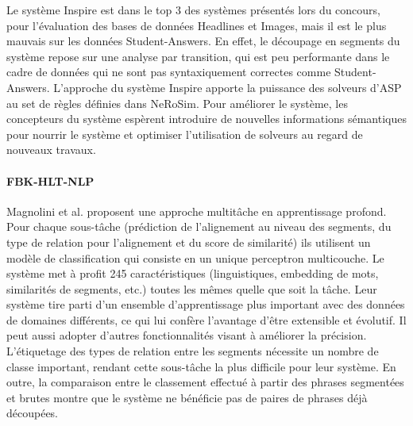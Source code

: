 \documentclass[a4paper, twoside, 11pt]{article}
\begin{document}
Le système Inspire est dans le top 3 des systèmes présentés lors du concours, pour l'évaluation des bases de données Headlines et Images, mais il est le plus mauvais sur les données Student-Answers. En effet, le découpage en segments du système repose sur une analyse par transition, qui est peu performante dans le cadre de données qui ne sont pas syntaxiquement correctes comme Student-Answers. L'approche du système Inspire apporte la puissance des solveurs d'ASP au set de règles définies dans NeRoSim. Pour améliorer le système, les concepteurs du système espèrent introduire de nouvelles informations sémantiques pour nourrir le système et optimiser l'utilisation de solveurs au regard de nouveaux travaux.

        \paragraph{FBK-HLT-NLP}
        \hfill \break
Magnolini et al. \cite{magnolini} proposent une approche multitâche en apprentissage profond. Pour chaque sous-tâche (prédiction de l’alignement au niveau des segments, du type de relation pour l’alignement et du score de similarité) ils utilisent un modèle de classification qui consiste en un unique perceptron multicouche. Le système met à profit 245 caractéristiques (linguistiques, embedding de mots, similarités de segments, etc.) toutes les mêmes quelle que soit la tâche.
Leur système tire parti d'un ensemble d'apprentissage plus important avec des données de domaines différents, ce qui lui confère l’avantage d’être extensible et évolutif. Il peut aussi adopter d’autres fonctionnalités visant à améliorer la précision.
L'étiquetage des types de relation entre les segments nécessite un nombre de classe important, rendant cette sous-tâche la plus difficile pour leur système.
En outre, la comparaison entre le classement effectué à partir des phrases segmentées et brutes montre que le système ne bénéficie pas de paires de phrases déjà découpées.
\end{document}
